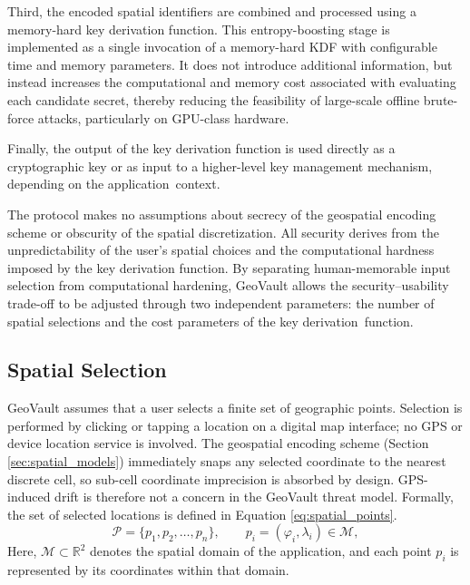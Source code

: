 \documentclass[mathematics,article,accept,pdftex,moreauthors]{Definitions/mdpi}
\begin{document}
Third, the encoded spatial identifiers are combined and processed using a memory-hard key derivation function. This entropy-boosting stage is implemented as a single invocation of a memory-hard KDF with configurable time and memory parameters. It does not introduce additional information, but instead increases the computational and memory cost associated with evaluating each candidate secret, thereby reducing the feasibility of large-scale offline brute-force attacks, particularly on GPU-class hardware.

Finally, the output of the key derivation function is used directly as a cryptographic key or as input to a higher-level key management mechanism, depending on the \linebreak{}\mbox{application context.}

The protocol makes no assumptions about secrecy of the geospatial encoding scheme or obscurity of the spatial discretization. All security derives from the unpredictability of the user’s spatial choices and the computational hardness imposed by the key derivation function. By separating human-memorable input selection from computational hardening, GeoVault allows the security--usability trade-off to be adjusted through two independent parameters: the number of spatial selections and the cost parameters of the key \mbox{derivation function.}


\subsection{Spatial Selection}

GeoVault assumes that a user selects a finite set of geographic points. {Selection is performed by clicking or tapping a location on a digital map interface; no GPS or device location service is involved. The geospatial encoding scheme (Section \ref{sec:spatial_models}) immediately snaps any selected coordinate to the nearest discrete cell, so sub-cell coordinate imprecision is absorbed by design. GPS-induced drift is therefore not a concern in the GeoVault threat model.} Formally, the set of selected locations is defined in Equation \eqref{eq:spatial_points}.
\begin{equation}
    \mathcal{P} = \{p_1, p_2, \dots, p_n\}, \qquad p_i = (\varphi_i, \lambda_i) \in \mathcal{M},
    \label{eq:spatial_points}
\end{equation}
Here, $\mathcal{M} \subset \mathbb{R}^2$ denotes the spatial domain of the application, and each point $p_i$ is represented by its coordinates within that domain.
\end{document}
